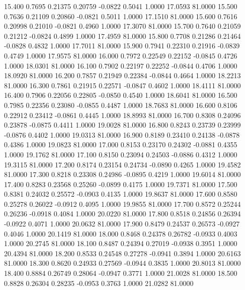   15.400   0.7695   0.21375   0.20759  -0.0822   0.5041   1.0000  17.0593  81.0000
  15.500   0.7636   0.21109   0.20860  -0.0821   0.5011   1.0000  17.1510  81.0000
  15.600   0.7616   0.20998   0.21010  -0.0821   0.4960   1.0000  17.3070  81.0000
  15.700   0.7640   0.21059   0.21212  -0.0824   0.4899   1.0000  17.4959  81.0000
  15.800   0.7708   0.21286   0.21464  -0.0828   0.4832   1.0000  17.7011  81.0000
  15.900   0.7941   0.22310   0.21916  -0.0839   0.4749   1.0000  17.9575  81.0000
  16.000   0.7972   0.22549   0.22152  -0.0845   0.4726   1.0000  18.0301  81.0000
  16.100   0.7902   0.22197   0.22252  -0.0844   0.4706   1.0000  18.0920  81.0000
  16.200   0.7857   0.21949   0.22384  -0.0844   0.4664   1.0000  18.2213  81.0000
  16.300   0.7861   0.21915   0.22571  -0.0847   0.4602   1.0000  18.4111  81.0000
  16.400   0.7906   0.22056   0.22805  -0.0850   0.4540   1.0000  18.6041  81.0000
  16.500   0.7985   0.22356   0.23080  -0.0855   0.4487   1.0000  18.7683  81.0000
  16.600   0.8106   0.22912   0.23412  -0.0861   0.4445   1.0000  18.8993  81.0000
  16.700   0.8308   0.24096   0.23878  -0.0875   0.4411   1.0000  19.0028  81.0000
  16.800   0.8243   0.23739   0.23999  -0.0876   0.4402   1.0000  19.0313  81.0000
  16.900   0.8189   0.23410   0.24138  -0.0878   0.4386   1.0000  19.0823  81.0000
  17.000   0.8153   0.23170   0.24302  -0.0881   0.4355   1.0000  19.1762  81.0000
  17.100   0.8150   0.23094   0.24503  -0.0886   0.4312   1.0000  19.3115  81.0000
  17.200   0.8174   0.23154   0.24734  -0.0890   0.4265   1.0000  19.4582  81.0000
  17.300   0.8218   0.23308   0.24986  -0.0895   0.4219   1.0000  19.6014  81.0000
  17.400   0.8283   0.23568   0.25260  -0.0899   0.4175   1.0000  19.7371  81.0000
  17.500   0.8381   0.24032   0.25572  -0.0903   0.4135   1.0000  19.8637  81.0000
  17.600   0.8580   0.25278   0.26022  -0.0912   0.4095   1.0000  19.9855  81.0000
  17.700   0.8572   0.25244   0.26236  -0.0918   0.4084   1.0000  20.0220  81.0000
  17.800   0.8518   0.24856   0.26394  -0.0922   0.4071   1.0000  20.0632  81.0000
  17.900   0.8479   0.24537   0.26573  -0.0927   0.4046   1.0000  20.1419  81.0000
  18.000   0.8468   0.24378   0.26782  -0.0933   0.4003   1.0000  20.2745  81.0000
  18.100   0.8487   0.24394   0.27019  -0.0938   0.3951   1.0000  20.4394  81.0000
  18.200   0.8533   0.24548   0.27278  -0.0941   0.3894   1.0000  20.6163  81.0000
  18.300   0.8620   0.24933   0.27569  -0.0944   0.3835   1.0000  20.8013  81.0000
  18.400   0.8884   0.26749   0.28064  -0.0947   0.3771   1.0000  21.0028  81.0000
  18.500   0.8828   0.26304   0.28235  -0.0953   0.3763   1.0000  21.0282  81.0000
